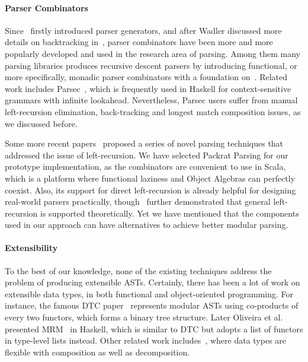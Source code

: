 \paragraph{Parser Combinators} Since~\cite{burge1975} firstly
introduced parser generators, and after Wadler discussed more details
on backtracking in~\cite{Wadler1985}, parser combinators have been
more and more popularly developed and used in the research area of
parsing. Among them many parsing libraries produces recursive descent
parsers by introducing functional, or more specifically, monadic
parser combinators with a foundation on~\cite{nott237}. Related work
includes Parsec~\cite{Leijen2001}, which is frequently used in Haskell
for context-sensitive grammars with infinite lookahead. Nevertheless,
Parsec users suffer from manual left-recursion elimination, back-tracking and
longest match composition issues, as we discussed before.

Some more recent papers~\cite{Ford2002,Might2011,Frost2008} proposed a series of
novel parsing techniques that addressed the issue
of left-recursion. We have selected Packrat
Parsing for our prototype implementation, as the combinators are
convenient to use in Scala, which is a platform where functional
laziness and Object Algebras can perfectly coexist. Also, its support
for direct left-recursion is already helpful for designing real-world
parsers practically, though~\cite{warth2008} further demonstrated that
general left-recursion is supported theoretically.
Yet we have mentioned that the components used in our approach
can have alternatives to achieve better modular parsing.




\paragraph{Extensibility} To the best of our knowledge, none of the existing techniques
address the problem of producing extensible ASTs. Certainly, there has been a lot of work on extensible
data types, in both functional and object-oriented programming.
For instance, the famous DTC paper~\cite{swierstra2008} represents
modular ASTs using co-products of every two functors, which forms a
binary tree structure. Later
Oliveira et al. presented MRM~\cite{Oliveira2015} in Haskell, which is
similar to DTC but adopts a list of functors in type-level lists
instead. Other related work
includes~\cite{Bahr2014}, where data types are flexible with
composition as well as decomposition.

